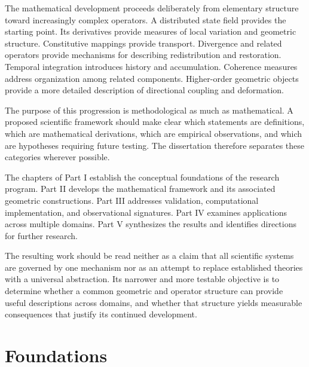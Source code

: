 \documentclass[12pt,oneside]{book}
\begin{document}
The mathematical development proceeds deliberately from
elementary structure toward increasingly complex operators.
A distributed state field provides the starting point. Its
derivatives provide measures of local variation and geometric
structure. Constitutive mappings provide transport. Divergence
and related operators provide mechanisms for describing
redistribution and restoration. Temporal integration introduces
history and accumulation. Coherence measures address
organization among related components. Higher-order geometric
objects provide a more detailed description of directional
coupling and deformation.

The purpose of this progression is methodological as much as
mathematical. A proposed scientific framework should make clear
which statements are definitions, which are mathematical
derivations, which are empirical observations, and which are
hypotheses requiring future testing. The dissertation therefore
separates these categories wherever possible.

The chapters of Part I establish the conceptual foundations of
the research program. Part II develops the mathematical
framework and its associated geometric constructions. Part III
addresses validation, computational implementation, and
observational signatures. Part IV examines applications across
multiple domains. Part V synthesizes the results and identifies
directions for further research.

The resulting work should be read neither as a claim that all
scientific systems are governed by one mechanism nor as an
attempt to replace established theories with a universal
abstraction. Its narrower and more testable objective is to
determine whether a common geometric and operator structure can
provide useful descriptions across domains, and whether that
structure yields measurable consequences that justify its
continued development.


\cleardoublepage

\part{Foundations}
\end{document}
